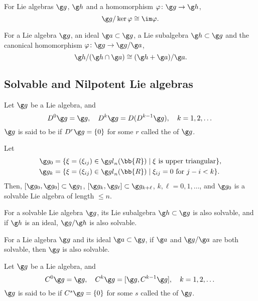 For Lie algebras $\g g$, $\g h$ and a homomorphism $\varphi \colon \g g \to \g h$,
\[
\g g / \ker \varphi \cong \im \varphi.
\]

For a Lie algebra $\g g$, an ideal $\g a \subset \g g$, a Lie subalgebra $\g h \subset \g g$ and the canonical homomorphism $\varphi \colon \g g \to \g g / \g a$,
\[
\g h / (\g h \cap \g a) \cong (\g h + \g a)/\g a.
\]

\subsection{Solvable and Nilpotent Lie algebras}
Let $\g g$ be a Lie algebra, and
\[
D^0\g g = \g g,\quad D^k \g g = D(D^{k-1}\g g),\quad k = 1, 2, \dotsc
\]
$\g g$ is said to be  if $D^r\g g = \{ 0 \}$ for some $r$ called the  of $\g g$.

Let
\begin{align*}
\g g_0 &= \{ \xi = (\xi_{ij}) \in \gl_n(\bb{R}) \mid \xi\ \text{is upper triangular} \}, \\
\g g_k &= \{ \xi = (\xi_{ij}) \in \gl_n(\bb{R}) \mid \xi_{ij} = 0 \ \text{for}\ j - i < k \}.
\end{align*}
Then, $[\g g_0, \g g_0] \subset \g g_1$, $[\g g_k, \g g_\ell] \subset \g g_{k+\ell}$, $k, \ell = 0, 1, \dotsc$, and $\g g_0$ is a solvable Lie algebra of length $\le n$.

For a solvable Lie algebra $\g g$, its Lie subalgebra $\g h \subset \g g$ is also solvable, and if $\g h$ is an ideal, $\g g / \g h$ is also solvable.

For a Lie algebra $\g g$ and its ideal $\g a \subset \g g$, if $\g a$ and $\g g / \g a$ are both solvable, then $\g g$ is also solvable.

Let $\g g$ be a Lie algebra, and
\[
C^0 \g g = \g g,\quad C^k \g g = [\g g, C^{k-1}\g g],\quad k = 1, 2, \dotsc
\]
$\g g$ is said to be  if $C^s \g g = \{ 0 \}$ for some $s$ called the  of $\g g$.

